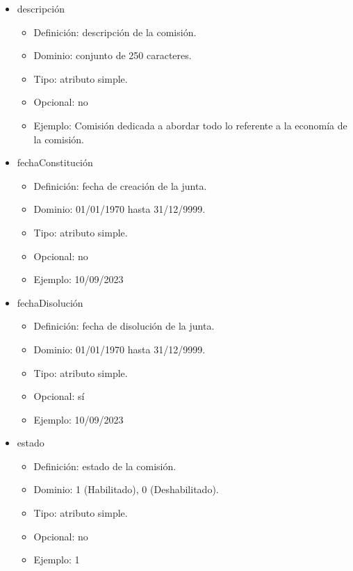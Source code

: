 \begin{itemize}
\begin{itemize}
        \item descripción
        \begin{itemize}
            \item Definición: descripción de la comisión.
            \item Dominio: conjunto de 250 caracteres.
            \item Tipo: atributo simple.
            \item Opcional: no
            \item Ejemplo: Comisión dedicada a abordar todo lo referente a la economía de la comisión.
        \end{itemize}

        \item fechaConstitución
        \begin{itemize}
            \item Definición: fecha de creación de la junta.
            \item Dominio: 01/01/1970 hasta 31/12/9999.
            \item Tipo: atributo simple.
            \item Opcional: no
            \item Ejemplo: 10/09/2023
        \end{itemize}

        \item fechaDisolución
        \begin{itemize}
            \item Definición: fecha de disolución de la junta.
            \item Dominio: 01/01/1970 hasta 31/12/9999.
            \item Tipo: atributo simple.
            \item Opcional: sí
            \item Ejemplo: 10/09/2023
        \end{itemize}

        \item estado
        \begin{itemize}
            \item Definición: estado de la comisión.
            \item Dominio: 1 (Habilitado), 0 (Deshabilitado).
            \item Tipo: atributo simple.
            \item Opcional: no
            \item Ejemplo: 1
        \end{itemize}
    \end{itemize}


\end{itemize}
